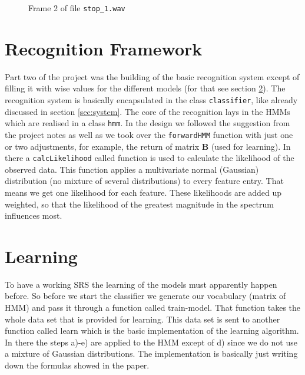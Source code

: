 \documentclass[titlepage]{article}
\begin{document}
\begin{figure}[htbp]
	\centering
	\label{fig:frame}
	\caption{Frame 2 of file \lstinline&stop_1.wav&}
\end{figure}

\section{Recognition Framework}\label{sec:hmm}
Part two of the project was the building of the basic recognition system except of filling it with wise values for the different models (for that see section \ref{sec:learn}). The recognition system is basically encapsulated in the class \lstinline&classifier&, like already discussed in section \ref{sec:system}. The core of the recognition lays in the HMMs which are realised in a class \lstinline&hmm&. In the design we followed the suggestion from the project notes as well as we took over the \lstinline&forwardHMM& function with just one or two adjustments, for example, the return of matrix \textbf{B} (used for learning). In there a \lstinline&calcLikelihood& called function is used to calculate the likelihood of the observed data. This function applies a multivariate normal (Gaussian) distribution (no mixture of several distributions) to every feature entry. That means we get one likelihood for each feature. These likelihoods are added up weighted, so that the likelihood of the greatest magnitude in the spectrum influences most.


\section{Learning}\label{sec:learn}
To have a working SRS the learning of the models must apparently happen before. So before we start the classifier we generate our vocabulary (matrix of HMM) and pass it through a function called train-model. That function takes the whole data set that is provided for learning. This data set is sent to another function called learn which is the basic implementation of the learning algorithm. In there the steps a)-e) are applied to the HMM except of d) since we do not use a mixture of Gaussian distributions. The implementation is basically just writing down the formulas showed in the paper.
\end{document}
